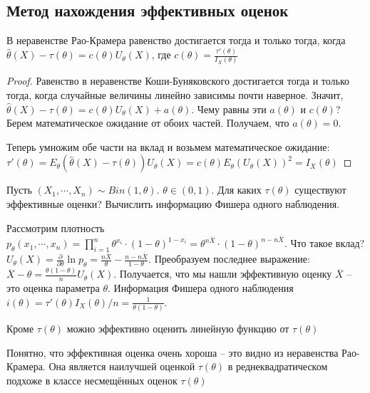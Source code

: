 \documentclass[document.tex]{subfiles}
\begin{document}
\subsection{Метод нахождения эффективных оценок}

\begin{lemma}
    В неравенстве Рао-Крамера равенство достигается тогда и только тогда, когда
    $\hat \theta(X) - \tau(\theta) = c(\theta) U_{\theta}(X)$, где $c(\theta) = \frac{\tau'(\theta)}{I_X(\theta)}$
\end{lemma}

\begin{proof}
    Равенство в неравенстве Коши-Буняковского достигается тогда и только тогда, когда случайные величины линейно
    зависимы почти наверное. Значит, $\hat \theta(X) - \tau(\theta) = c(\theta) U_{\theta}(X) + a(\theta)$. Чему равны
    эти $a(\theta)$ и $c(\theta)$? Берем математическое ожидание от обоих частей.
    Получаем, что $a(\theta) = 0$.

    Теперь умножим обе части на вклад и возьмем математическое ожидание:
    $\tau'(\theta) = E_{\theta}(\hat \theta(X) - \tau(\theta))U_{\theta}(X) = c(\theta) E_{\theta}(U_{\theta}(X))^2 =
    I_{X}(\theta)$
\end{proof}
\begin{example}
    Пусть $(X_1, \cdots, X_n) \sim Bin(1, \theta)$. $\theta \in (0, 1)$. Для каких $\tau(\theta)$ существуют эффективные
    оценки? Вычислить информацию Фишера одного наблюдения.

    Рассмотрим плотность $p_{\theta}(x_1, \cdots, x_n) = \prod_{i = 1}^n \theta^{x_i} \cdot (1 - \theta)^{1 - x_i} =
    \theta^{n \overline X} \cdot (1 - \theta)^{n - n \overline X}$. Что такое вклад?
    $U_{\theta}(X) = \frac{\partial}{\partial \theta} \ln p_{\theta} = \frac{n \overline X}{\theta} -
    \frac{n - n \overline X}{1 - \theta}$.
    Преобразуем последнее выражение:
    $\overline X - \theta = \frac{\theta (1 - \theta)}{n}U_{\theta}(X)$. Получается, что мы нашли эффективную оценку
    $\overline X$ -- это оценка параметра $\theta$. Информация Фишера одного наблюдения $i(\theta) = \tau'(\theta)
    I_X(\theta) / n = \frac{1}{\theta (1 - \theta)}$.

    Кроме $\tau(\theta)$ можно эффективно оценить линейную функцию от $\tau(\theta)$
\end{example}

\begin{remark}
Понятно, что эффективная оценка очень хороша -- это видно из неравенства Рао-Крамера. Она является наилучшей оценкой
$\tau(\theta)$ в реднеквадратическом подхоже в классе несмещённых оценок $\tau(\theta)$
\end{remark}
\end{document}
